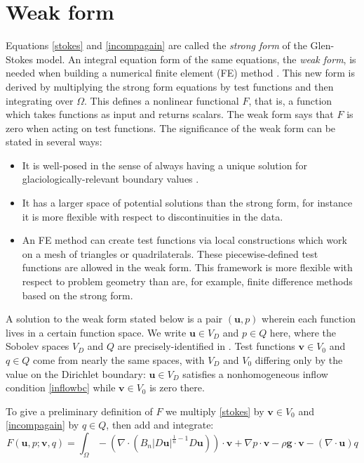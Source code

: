 \documentclass[letterpaper,final,12pt,reqno]{amsart}
\newcommand{\bu}{\mathbf{u}}
\newcommand{\bv}{\mathbf{v}}
\begin{document}
\section{Weak form} \label{sec:weakform}

Equations \eqref{stokes} and \eqref{incompagain} are called the \emph{strong form} of the Glen-Stokes model.  An integral equation form of the same equations, the \emph{weak form}, is needed when building a numerical finite element (FE) method \cite{Elmanetal2014}.  This new form is derived by multiplying the strong form equations by test functions and then integrating over $\Omega$.  This defines a nonlinear functional $F$, that is, a function which takes functions as input and returns scalars.  The weak form says that $F$ is zero when acting on test functions.  The significance of the weak form can be stated in several ways:
\begin{itemize}
\item It is well-posed in the sense of always having a unique solution  for glaciologically-relevant boundary values \cite{JouvetRappaz2011}.
\item It has a larger space of potential solutions than the strong form, for instance it is more flexible with respect to discontinuities in the data.
\item An FE method can create test functions via local constructions which work on a mesh of triangles or quadrilaterals.  These piecewise-defined test functions are allowed in the weak form.  This framework is more flexible with respect to problem geometry than are, for example, finite difference methods based on the strong form.
\end{itemize}

A solution to the weak form stated below is a pair $(\bu,p)$ wherein each function lives in a certain function space.  We write $\bu\in V_D$ and $p \in Q$ here, where the Sobolev spaces $V_D$ and $Q$ are precisely-identified in \cite{JouvetRappaz2011}.  Test functions $\bv\in V_0$ and $q\in Q$ come from nearly the same spaces, with $V_D$ and $V_0$ differing only by the value on the Dirichlet boundary: $\bu\in V_D$ satisfies a nonhomogeneous inflow condition \eqref{inflowbc} while $\bv\in V_0$ is zero there.

To give a preliminary definition of $F$ we multiply \eqref{stokes} by $\bv\in V_0$ and \eqref{incompagain} by $q\in Q$, then add and integrate:
\begin{equation}
F(\bu,p;\bv,q) = \int_\Omega - \left(\nabla \cdot \left(B_n |D\bu|^{\frac{1}{n} - 1} D\bu\right)\right)\cdot \bv + \nabla p \cdot \bv - \rho \mathbf{g} \cdot \bv - \left(\nabla \cdot \bu\right) q \label{nonfuncone}
\end{equation}
\end{document}
